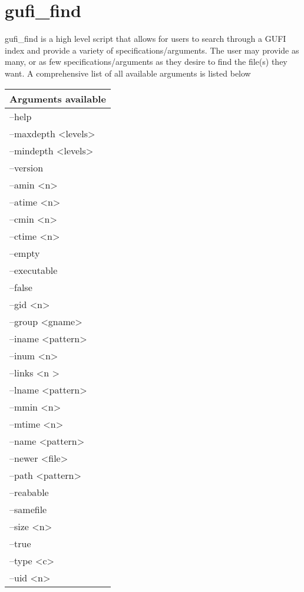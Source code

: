 \section{gufi\_find}
gufi\_find is a high level script that allows for users to search through a GUFI index and provide a variety of specifications/arguments. The user may provide as many, or as few specifications/arguments as they desire to find the file(s) they want. A comprehensive list of all available arguments is listed below 

\begin{table} [h]
\centering
\begin{tabular}{l}
Arguments available \\\hline
--help\\
--maxdepth \textless levels\textgreater\\
--mindepth \textless levels\textgreater\\
--version\\
--amin \textless n\textgreater\\
--atime \textless n\textgreater\\
--cmin \textless n\textgreater\\
--ctime \textless n\textgreater\\
--empty\\
--executable\\
--false\\
--gid \textless n\textgreater\\
--group \textless gname\textgreater\\
--iname \textless pattern\textgreater\\ 
--inum \textless n\textgreater\\
--links \textless n \textgreater\\
--lname \textless pattern\textgreater\\
--mmin \textless n\textgreater\\
--mtime \textless n\textgreater\\
--name \textless pattern\textgreater\\
--newer \textless file\textgreater\\
--path \textless pattern\textgreater\\
--reabable\\
--samefile\\
--size \textless n\textgreater\\
--true\\
--type \textless c\textgreater\\
--uid \textless n\textgreater\\

\end{tabular}
\end{table}
